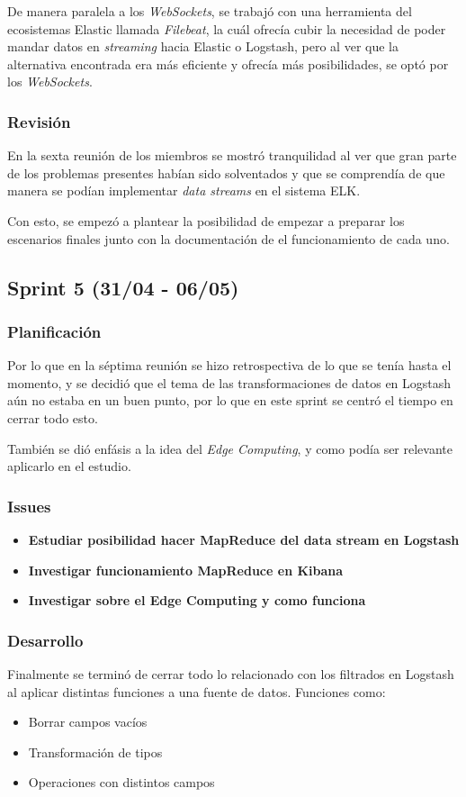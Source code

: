 De manera paralela a los \textit{WebSockets}, se trabajó con una herramienta del ecosistemas Elastic llamada \textit{Filebeat}, la cuál ofrecía cubir la necesidad de poder mandar datos en \textit{streaming} hacia Elastic o Logstash, pero al ver que la alternativa encontrada era más eficiente y ofrecía más posibilidades, se optó por los \textit{WebSockets}.

\subsubsection{Revisión}
En la sexta reunión de los miembros se mostró tranquilidad al ver que gran parte de los problemas presentes habían sido solventados y que se comprendía de que manera se podían implementar \textit{data streams} en el sistema ELK.

Con esto, se empezó a plantear la posibilidad de empezar a preparar los escenarios finales junto con la documentación de el funcionamiento de cada uno.

\subsection{Sprint 5 (31/04 - 06/05)}
\subsubsection{Planificación}
Por lo que en la séptima reunión se hizo retrospectiva de lo que se tenía hasta el momento, y se decidió que el tema de las transformaciones de datos en Logstash aún no estaba en un buen punto, por lo que en este sprint se centró el tiempo en cerrar todo esto.

También se dió enfásis a la idea del \textit{Edge Computing}, y como podía ser relevante aplicarlo en el estudio.

\subsubsection{Issues}
\begin{itemize} 
    \item \textbf{Estudiar posibilidad hacer MapReduce del data stream en Logstash}  
    \item \textbf{Investigar funcionamiento MapReduce en Kibana}    
    \item \textbf{Investigar sobre el Edge Computing y como funciona} 
\end{itemize}

\subsubsection{Desarrollo}
Finalmente se terminó de cerrar todo lo relacionado con los filtrados en Logstash al aplicar distintas funciones a una fuente de datos. Funciones como:
\begin{itemize}
    \item Borrar campos vacíos
    \item Transformación de tipos
    \item Operaciones con distintos campos
\end{itemize}

